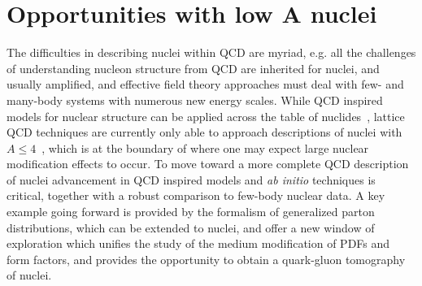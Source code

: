 \section{Opportunities with low $\mathbf{A}$ nuclei\label{sec:light}}
%
The difficulties in describing nuclei within QCD are myriad, e.g. all the challenges of understanding nucleon structure from QCD are inherited for nuclei, and usually amplified, and effective field theory approaches must deal with few- and many-body systems with numerous new energy scales. While QCD inspired models for nuclear structure can be applied across the table of nuclides~\cite{Cloet:2006bq,Cloet:2015tha,Stone:2017oqt,Stone:2016qmi}, lattice QCD 
techniques are currently only able to approach descriptions of nuclei with $A \leqslant 4$~\cite{Chang:2015qxa}, which is at the boundary of where one may expect large nuclear modification effects to occur. To move toward a more complete QCD description of nuclei advancement in QCD inspired models and {\it ab initio} techniques is critical, together with a robust comparison to few-body nuclear data. A key example going forward is provided by the formalism of generalized parton distributions, which can be extended to nuclei, and offer a new window of exploration which unifies the study of the medium modification of PDFs and form factors, and provides the opportunity to obtain a quark-gluon tomography of nuclei. 